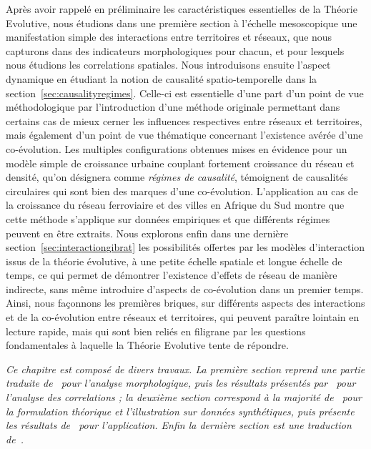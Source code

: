 Après avoir rappelé en préliminaire les caractéristiques essentielles de la Théorie Evolutive, nous étudions dans une première section à l'échelle mesoscopique une manifestation simple des interactions entre territoires et réseaux, que nous capturons dans des indicateurs morphologiques pour chacun, et pour lesquels nous étudions les correlations spatiales. Nous introduisons ensuite l'aspect dynamique en étudiant la notion de causalité spatio-temporelle dans la section~\ref{sec:causalityregimes}. Celle-ci est essentielle d'une part d'un point de vue méthodologique par l'introduction d'une méthode originale permettant dans certains cas de mieux cerner les influences respectives entre réseaux et territoires, mais également d'un point de vue thématique concernant l'existence avérée d'une co-évolution. Les multiples configurations obtenues mises en évidence pour un modèle simple de croissance urbaine couplant fortement croissance du réseau et densité, qu'on désignera comme \emph{régimes de causalité}, témoignent de causalités circulaires qui sont bien des marques d'une co-évolution. L'application au cas de la croissance du réseau ferroviaire et des villes en Afrique du Sud montre que cette méthode s'applique sur données empiriques et que différents régimes peuvent en être extraits. Nous explorons enfin dans une dernière section~\ref{sec:interactiongibrat} les possibilités offertes par les modèles d'interaction issus de la théorie évolutive, à une petite échelle spatiale et longue échelle de temps, ce qui permet de démontrer l'existence d'effets de réseau de manière indirecte, sans même introduire d'aspects de co-évolution dans un premier temps. Ainsi, nous façonnons les premières briques, sur différents aspects des interactions et de la co-évolution entre réseaux et territoires, qui peuvent paraître lointain en lecture rapide, mais qui sont bien reliés en filigrane par les questions fondamentales à laquelle la Théorie Evolutive tente de répondre.





\stars


\textit{Ce chapitre est composé de divers travaux. La première section reprend une partie traduite de~\cite{raimbault2017calibration} pour l'analyse morphologique, puis les résultats présentés par~\cite{raimbault2016cautious} pour l'analyse des correlations ; la deuxième section correspond à la majorité de~\cite{raimbault2017identification} pour la formulation théorique et l'illustration sur données synthétiques, puis présente les résultats de~\cite{raimbault:halshs-01584914} pour l'application. Enfin la dernière section est une traduction de~\cite{raimbault2017indirect}.}



